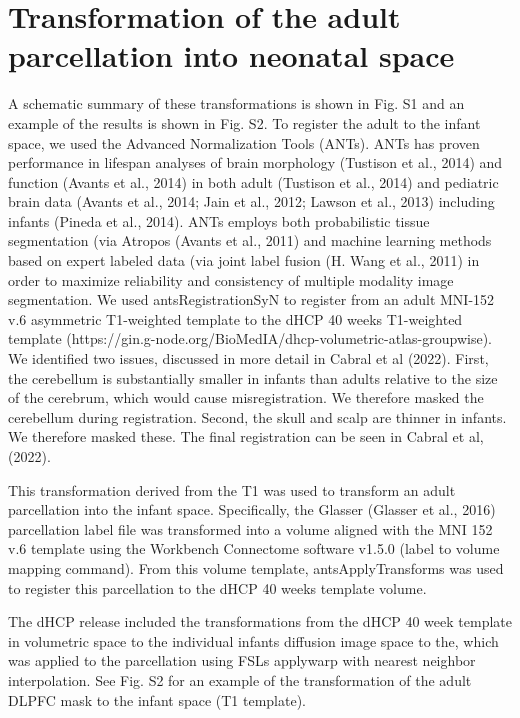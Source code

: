 \documentclass[11pt]{article}
\begin{document}
\section{Transformation of the adult parcellation into neonatal space}

A schematic summary of these transformations is shown in Fig. S1 and an
example of the results is shown in Fig. S2. To register the adult to the
infant space, we used the Advanced Normalization Tools (ANTs). ANTs has
proven performance in lifespan analyses of brain morphology (Tustison et
al., 2014) and function (Avants et al., 2014) in both adult (Tustison et
al., 2014) and pediatric brain data (Avants et al., 2014; Jain et al.,
2012; Lawson et al., 2013) including infants (Pineda et al., 2014). ANTs
employs both probabilistic tissue segmentation (via Atropos (Avants et
al., 2011) and machine learning methods based on expert labeled data
(via joint label fusion (H. Wang et al., 2011) in order to maximize
reliability and consistency of multiple modality image segmentation. We
used antsRegistrationSyN to register from an adult MNI-152 v.6
asymmetric T1-weighted template to the dHCP 40 weeks T1-weighted
template
(https://gin.g-node.org/BioMedIA/dhcp-volumetric-atlas-groupwise). We
identified two issues, discussed in more detail in Cabral et al (2022).
First, the cerebellum is substantially smaller in infants than adults
relative to the size of the cerebrum, which would cause misregistration.
We therefore masked the cerebellum during registration. Second, the
skull and scalp are thinner in infants. We therefore masked these. The
final registration can be seen in Cabral et al, (2022).

This transformation derived from the T1 was used to transform an adult
parcellation into the infant space. Specifically, the Glasser (Glasser
et al., 2016) parcellation label file was transformed into a volume
aligned with the MNI 152 v.6 template using the Workbench Connectome
software v1.5.0 (label to volume mapping command). From this volume
template, antsApplyTransforms was used to register this parcellation to
the dHCP 40 weeks template volume.

The dHCP release included the transformations from the dHCP 40 week
template in volumetric space to the individual infant\textquotesingle s
diffusion image space to the, which was applied to the parcellation
using FSL\textquotesingle s applywarp with nearest neighbor
interpolation. See Fig. S2 for an example of the transformation of the
adult DLPFC mask to the infant space (T1 template).
\end{document}
